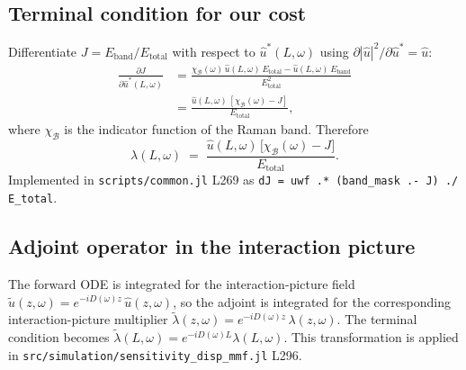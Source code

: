 \documentclass[11pt]{article}
\providecommand{\pdv}[2]{\frac{\partial #1}{\partial #2}}
\newcommand{\uhat}{\hat{u}}
\newcommand{\utilde}{\tilde{u}}
\begin{document}
\subsection{Terminal condition for our cost}

Differentiate $J = E_\text{band}/E_\text{total}$ with respect to $\uhat^*(L,\omega)$
using $\partial |\uhat|^2 / \partial \uhat^* = \uhat$:
\begin{align*}
  \pdv{J}{\uhat^*(L,\omega)}
  &= \frac{\chi_\mathcal{B}(\omega)\,\uhat(L,\omega)\,E_\text{total}
            - \uhat(L,\omega)\,E_\text{band}}
           {E_\text{total}^2} \\[0.3em]
  &= \frac{\uhat(L,\omega)\,[\chi_\mathcal{B}(\omega) - J]}{E_\text{total}},
\end{align*}
where $\chi_\mathcal{B}$ is the indicator function of the Raman band.
Therefore
\begin{equation}
  \lambda(L,\omega)
  \;=\; \frac{\uhat(L,\omega)\,\bigl[\chi_\mathcal{B}(\omega) - J\bigr]}
              {E_\text{total}}.
  \label{eq:terminal_explicit}
\end{equation}
Implemented in \texttt{scripts/common.jl} L269 as
\texttt{dJ = uwf .* (band\_mask .- J) ./ E\_total}.

\subsection{Adjoint operator in the interaction picture}

The forward ODE is integrated for the interaction-picture field
$\utilde(z,\omega) = e^{-iD(\omega)z}\,\uhat(z,\omega)$, so the adjoint is
integrated for the corresponding interaction-picture multiplier
$\tilde{\lambda}(z,\omega) = e^{-iD(\omega)z}\,\lambda(z,\omega)$. The terminal
condition becomes $\tilde{\lambda}(L,\omega) = e^{-iD(\omega)L}\lambda(L,\omega)$.
This transformation is applied in
\texttt{src/simulation/sensitivity\_disp\_mmf.jl} L296.
\end{document}
